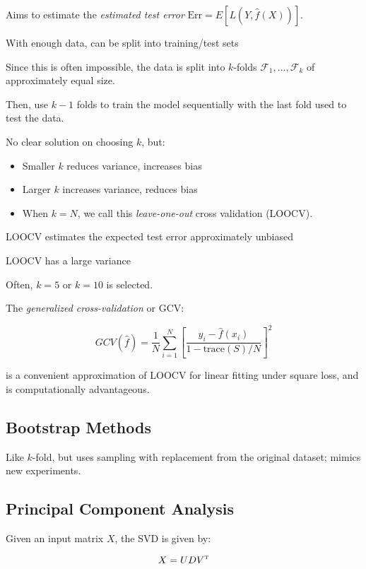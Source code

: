 \documentclass[twoside,twocolumn,10pt]{revtex4-1}
\begin{document}
	Aims to estimate the \textit{estimated test error} $\text{Err} = E[L(Y,\hat{f}(X))]$.
	
	With enough data, can be split into training/test sets
	
	Since this is often impossible, the data is split into $k$-folds $\mathcal{F}_1, ..., \mathcal{F}_k$ of approximately equal size.
	
	Then, use $k-1$ folds to train the model sequentially with the last fold used to test the data.
	
	No clear solution on choosing $k$, but:
	
	\begin{itemize}
	\item Smaller $k$ reduces variance, increases bias
	\item Larger $k$ increases variance, reduces bias
	\item When $k=N$, we call this \textit{leave-one-out} cross validation (LOOCV).
	\end{itemize}
	
	LOOCV estimates the expected test error approximately unbiased
	
	LOOCV has a large variance
	
	Often, $k = 5$ or $k = 10$ is selected.
	
	
	The \textit{generalized cross-validation} or GCV:
	
	\begin{equation*}
	GCV(\hat{f}) = \frac{1}{N} \sum_{i=1}^N \left[ \frac{y_i - \hat{f}(x_i)}{1 - \text{trace}(S)/N} \right]^2
	\end{equation*}		
	
	is a convenient approximation of LOOCV for linear fitting under square loss, and is computationally advantageous.
	
	\subsection{Bootstrap Methods}
	
	Like $k$-fold, but uses sampling with replacement from the original dataset; mimics new experiments.
	
	\subsection{Principal Component Analysis}
	
	Given an input matrix $X$, the SVD is given by:
	
	\begin{equation*}
	X = UDV^\textsc{t}
	\end{equation*}
	
\end{document}
